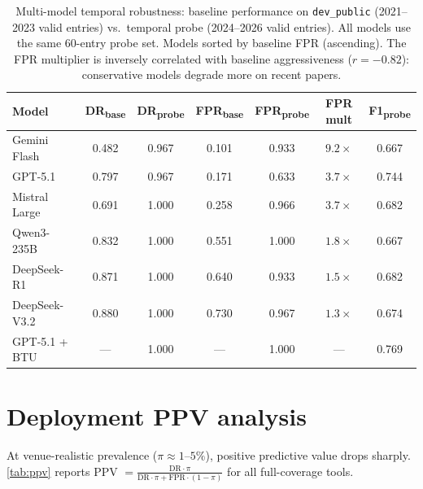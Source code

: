 \begin{table}[t]
\centering
\caption{Multi-model temporal robustness: baseline performance on \texttt{dev\_public} (2021--2023 valid entries) vs.\ temporal probe (2024--2026 valid entries). All models use the same 60-entry probe set. Models sorted by baseline FPR (ascending). The FPR multiplier is inversely correlated with baseline aggressiveness ($r = -0.82$): conservative models degrade more on recent papers.}
\label{tab:temporal_multi}
\small
\setlength{\tabcolsep}{3pt}
\begin{tabular}{lcccccc}
\toprule
\textbf{Model} & \textbf{DR\textsubscript{base}} & \textbf{DR\textsubscript{probe}} & \textbf{FPR\textsubscript{base}} & \textbf{FPR\textsubscript{probe}} & \textbf{FPR mult} & \textbf{F1\textsubscript{probe}} \\
\midrule
Gemini Flash       & 0.482 & 0.967 & 0.101 & 0.933 & $9.2{\times}$ & 0.667 \\
GPT-5.1            & 0.797 & 0.967 & 0.171 & 0.633 & $3.7{\times}$ & 0.744 \\
Mistral Large      & 0.691 & 1.000 & 0.258 & 0.966 & $3.7{\times}$ & 0.682 \\
Qwen3-235B         & 0.832 & 1.000 & 0.551 & 1.000 & $1.8{\times}$ & 0.667 \\
DeepSeek-R1        & 0.871 & 1.000 & 0.640 & 0.933 & $1.5{\times}$ & 0.682 \\
DeepSeek-V3.2      & 0.880 & 1.000 & 0.730 & 0.967 & $1.3{\times}$ & 0.674 \\
\midrule
GPT-5.1 + BTU      & ---   & 1.000 & ---   & 1.000 & ---           & 0.769 \\
\bottomrule
\end{tabular}
\end{table}

\section{Deployment PPV analysis}
\label{app:ppv}

At venue-realistic prevalence ($\pi \approx 1$--$5\%$), positive predictive value drops sharply.
\cref{tab:ppv} reports PPV $= \frac{\text{DR}\cdot\pi}{\text{DR}\cdot\pi + \text{FPR}\cdot(1-\pi)}$ for all full-coverage tools.

